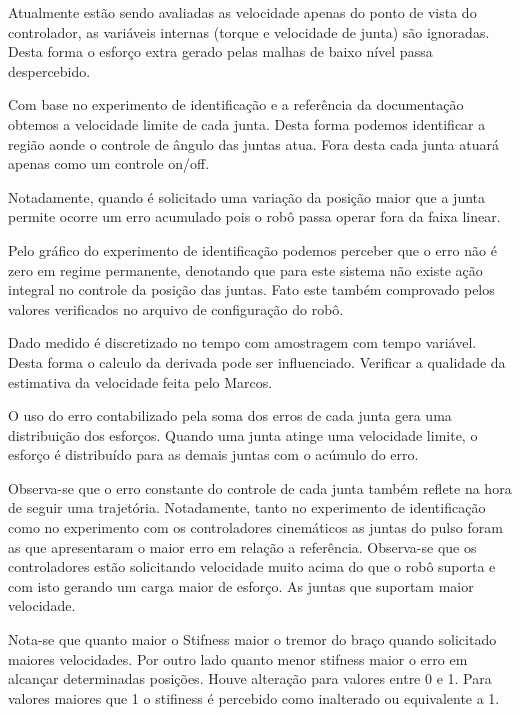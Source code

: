 Atualmente estão sendo avaliadas as velocidade apenas do ponto de vista do controlador, as variáveis internas (torque e velocidade de junta) são ignoradas. Desta forma o esforço extra gerado pelas malhas de baixo nível passa despercebido.

Com base no experimento de identificação e a referência da documentação obtemos a velocidade limite de cada junta. Desta forma podemos identificar a região aonde o controle de ângulo das juntas atua. Fora desta cada junta atuará apenas como um controle on/off.

Notadamente, quando é solicitado uma variação da posição maior que a junta permite ocorre um erro acumulado pois o robô passa operar fora da faixa linear.

Pelo gráfico do experimento de identificação podemos perceber que o erro não é zero em regime permanente, denotando que para este sistema não existe ação integral no controle da posição das juntas. Fato este também comprovado pelos valores verificados no arquivo de configuração do robô.

Dado medido é discretizado no tempo com amostragem com tempo variável. Desta forma o calculo da derivada pode ser influenciado. Verificar a qualidade da estimativa da velocidade feita pelo Marcos.

O uso do erro contabilizado pela soma dos erros de cada junta gera uma distribuição dos esforços. Quando uma junta atinge uma velocidade limite, o esforço é distribuído para as demais juntas com o acúmulo do erro.

Observa-se que o erro constante do controle de cada junta também reflete na hora de seguir uma trajetória. Notadamente, tanto no experimento de identificação como no experimento com os controladores cinemáticos as juntas do pulso foram as que apresentaram o maior erro em relação a referência. Observa-se que os controladores estão solicitando velocidade muito acima do que o robô suporta e com isto gerando um carga maior de esforço. As juntas que suportam maior velocidade.

Nota-se que quanto maior o Stifness maior o tremor do braço quando solicitado maiores velocidades. Por outro lado quanto menor stifness maior o erro em alcançar determinadas posições. Houve alteração para valores entre 0 e 1. Para valores maiores que 1 o stifiness é percebido como inalterado ou equivalente a 1.

